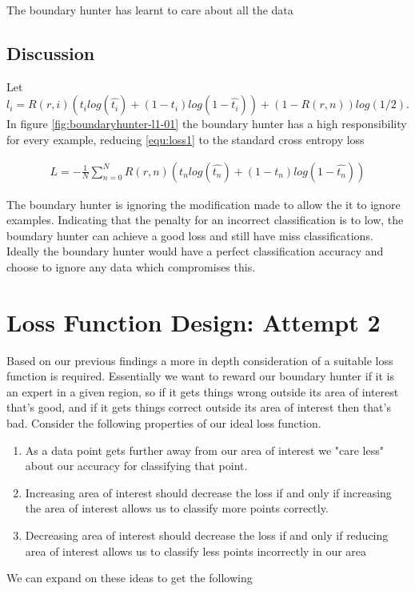 \documentclass[notitlepage]{report}
\theoremstyle{definition}
\begin{document}
The boundary hunter has learnt to care about all the data 

\subsection{Discussion}
Let $l_i = R(r, i) (t_i log(\widehat{t_i}) + (1-t_i)log(1 - \widehat{t_i})) + (1-R(r, n)) log(1/2)$. In figure \ref{fig:boundaryhunter-l1-01} the boundary hunter has a high responsibility for every example, reducing \ref{equ:loss1} to the standard cross entropy loss

\begin{align*}
L = -\frac{1}{N} \sum_{n=0}^N R(r, n) (t_n log(\widehat{t_n}) + (1-t_n)log(1 - \widehat{t_n}))
\end{align*} 

The boundary hunter is ignoring the modification made to allow the it to ignore examples. Indicating that the penalty for an incorrect classification is to low, the boundary hunter can achieve a good loss and still have miss classifications. Ideally the boundary hunter would have a perfect classification accuracy and choose to ignore any data which compromises this.

\section{Loss Function Design: Attempt 2}
Based on our previous findings a more in depth consideration of a suitable loss function is required. Essentially we want to reward our boundary hunter if it is an expert in a given region, so if it gets things wrong outside its area of interest that's good, and if it gets things correct outside its area of interest then that's bad. Consider the following properties of our ideal loss function.

\begin{enumerate}
\item As a data point gets further away from our area of interest we "care less" about our accuracy for classifying that point.
\item Increasing area of interest should decrease the loss if and only if increasing the area of interest allows us to classify more points correctly.
\item Decreasing area of interest should decrease the loss if and only if reducing area of interest allows us to classify less points incorrectly in our area
\end{enumerate}

We can expand on these ideas to get the following
\end{document}
